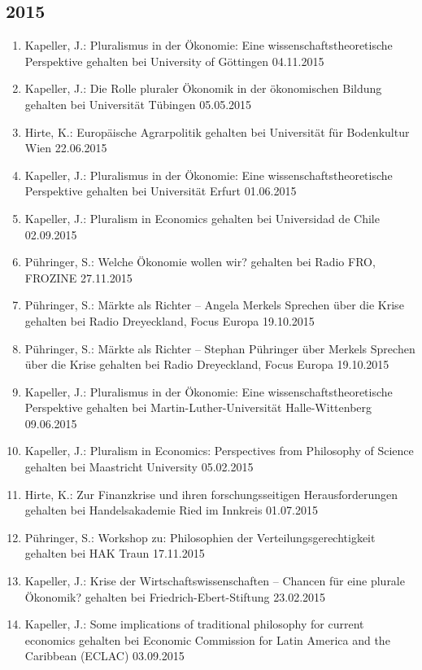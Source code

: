 \subsection*{2015}
\begin{enumerate}
	\item Kapeller, J.: Pluralismus in der Ökonomie: Eine wissenschaftstheoretische Perspektive gehalten bei University of Göttingen 04.11.2015
	\item Kapeller, J.: Die Rolle pluraler Ökonomik in der ökonomischen Bildung gehalten bei Universität Tübingen 05.05.2015
	\item Hirte, K.: Europäische Agrarpolitik gehalten bei Universität für Bodenkultur Wien 22.06.2015
	\item Kapeller, J.: Pluralismus in der Ökonomie: Eine wissenschaftstheoretische Perspektive gehalten bei Universität Erfurt 01.06.2015
	\item Kapeller, J.: Pluralism in Economics gehalten bei Universidad de Chile 02.09.2015
	\item Pühringer, S.: Welche Ökonomie wollen wir? gehalten bei Radio FRO, FROZINE 27.11.2015
	\item Pühringer, S.: Märkte als Richter – Angela Merkels Sprechen über die Krise gehalten bei Radio Dreyeckland, Focus Europa 19.10.2015
	\item Pühringer, S.: \glqq Märkte als Richter\grqq{} -- Stephan Pühringer über Merkels Sprechen über die Krise gehalten bei Radio Dreyeckland, Focus Europa 19.10.2015
	\item Kapeller, J.: Pluralismus in der Ökonomie: Eine wissenschaftstheoretische Perspektive gehalten bei Martin-Luther-Universität Halle-Wittenberg 09.06.2015
	\item Kapeller, J.: Pluralism in Economics: Perspectives from Philosophy of Science gehalten bei Maastricht University 05.02.2015
	\item Hirte, K.: Zur Finanzkrise und ihren forschungsseitigen Herausforderungen gehalten bei Handelsakademie Ried im Innkreis 01.07.2015
	\item Pühringer, S.: Workshop zu: Philosophien der Verteilungsgerechtigkeit gehalten bei HAK Traun 17.11.2015
	\item Kapeller, J.: Krise der Wirtschaftswissenschaften -- Chancen für eine plurale Ökonomik? gehalten bei Friedrich-Ebert-Stiftung 23.02.2015
	\item Kapeller, J.: Some implications of traditional philosophy for current economics gehalten bei Economic Commission for Latin America and the Caribbean (ECLAC) 03.09.2015

\end{enumerate}
